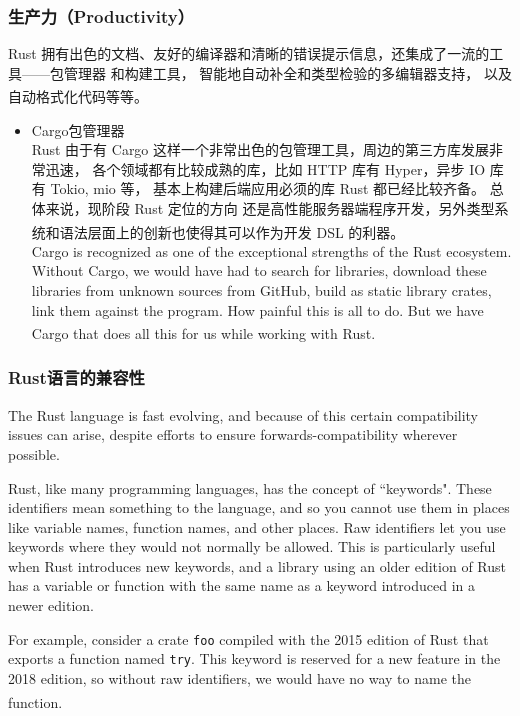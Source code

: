 \documentclass[UTF8,fontset=none,linespread=1.15]{ctexart}
\let\nosupcite\cite
\renewcommand*{\cite}[1]{\textsuperscript{\nosupcite{#1}}}
\begin{document}
\subsubsection{生产力（Productivity）}

Rust 拥有出色的文档、友好的编译器和清晰的错误提示信息，还集成了一流的工具——包管理器
和构建工具， 智能地自动补全和类型检验的多编辑器支持， 以及自动格式化代码等等。\cite{bib:1-rust-lang}

\begin{itemize}
\item Cargo包管理器\\
  Rust 由于有 Cargo 这样一个非常出色的包管理工具，周边的第三方库发展非常迅速，
  各个领域都有比较成熟的库，比如 HTTP 库有 Hyper，异步 IO 库有 Tokio, mio 等，
  基本上构建后端应用必须的库 Rust 都已经比较齐备。 总体来说，现阶段 Rust 定位的方向
  还是高性能服务器端程序开发，另外类型系统和语法层面上的创新也使得其可以作为开发 DSL
  的利器。\cite{bib:2-why-rust}\\
  Cargo is recognized as one of the exceptional strengths of the Rust ecosystem.
  Without Cargo, we would have had to search for libraries, download these
  libraries from unknown sources from GitHub, build as static library crates,
  link them against the program. How painful this is all to do. But we have
  Cargo that does all this for us while working with Rust.\cite{bib:7-rust-by-num}
\end{itemize}
\subsubsection{Rust语言的兼容性}

The Rust language is fast evolving, and because of this certain compatibility
issues can arise, despite efforts to ensure forwards-compatibility wherever possible.

Rust, like many programming languages, has the concept of ``keywords". These
identifiers mean something to the language, and so you cannot use them in places
like variable names, function names, and other places. Raw identifiers let you use
keywords where they would not normally be allowed. This is particularly useful
when Rust introduces new keywords, and a library using an older edition of Rust
has a variable or function with the same name as a keyword introduced in a newer edition.

For example, consider a crate \texttt{foo} compiled with the 2015 edition of Rust that
exports a function named \texttt{try}. This keyword is reserved for a new feature in the
 2018 edition, so without raw identifiers, we would have no way to name the function.\cite{bib:8-rust-compatibility}
\end{document}
